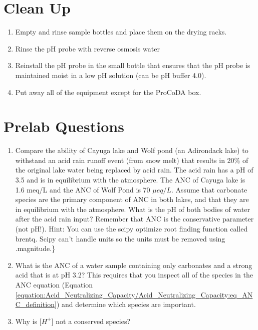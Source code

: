 \documentclass[letterpaper,10pt,english]{sphinxmanual}
\begin{document}
\section{Clean Up}
\label{\detokenize{Acid_Neutralizing_Capacity/Acid_Neutralizing_Capacity:clean-up}}\label{\detokenize{Acid_Neutralizing_Capacity/Acid_Neutralizing_Capacity:heading-anc-clean-up}}\begin{enumerate}
\item {} 
Empty and rinse sample bottles and place them on the drying racks.

\item {} 
Rinse the pH probe with reverse osmosis water

\item {} 
Reinstall the pH probe in the small bottle that ensures that the pH probe is maintained moist in a low pH solution (can be pH buffer 4.0).

\item {} 
Put away all of the equipment except for the ProCoDA box.

\end{enumerate}


\section{Prelab Questions}
\label{\detokenize{Acid_Neutralizing_Capacity/Acid_Neutralizing_Capacity:prelab-questions}}\label{\detokenize{Acid_Neutralizing_Capacity/Acid_Neutralizing_Capacity:heading-anc-prelab-questions}}\begin{enumerate}
\item {} 
Compare the ability of Cayuga lake and Wolf pond (an Adirondack lake) to withstand an acid rain runoff event (from snow melt) that results in 20\% of the original lake water being replaced by acid rain. The acid rain has a pH of 3.5 and is in equilibrium with the atmosphere. The ANC of Cayuga lake is 1.6 meq/L and the ANC of Wolf Pond is 70 \(\mu eq/L\). Assume that carbonate species are the primary component of ANC in both lakes, and that they are in equilibrium with the atmosphere. What is the pH of both bodies of water after the acid rain input? Remember that ANC is the conservative parameter (not pH!). Hint: You can use the scipy optimize root finding function called brentq. Scipy can’t handle units so the units must be removed using .magnitude.\}

\item {} 
What is the ANC of a water sample containing only carbonates and a strong acid that is at pH 3.2? This requires that you inspect all of the species in the ANC equation (Equation \eqref{equation:Acid_Neutralizing_Capacity/Acid_Neutralizing_Capacity:eq_ANC_definition}) and determine which species are important.

\item {} 
Why is {[}\(H^+\){]} not a conserved species?

\end{enumerate}
\end{document}
